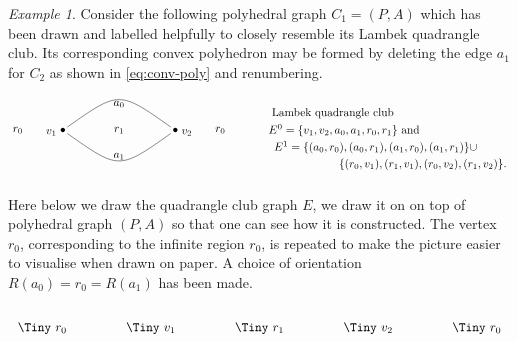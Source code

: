 \documentclass[12pt]{amsart}
\theoremstyle{definition}
\theoremstyle{remark}
\newtheorem{example}[thm]{Example}
\numberwithin{equation}{section}
\begin{document}
\begin{example} \label{ex:C1}
Consider the following polyhedral graph $C_1=(P,A)$ which has been drawn and labelled helpfully to closely resemble its Lambek quadrangle club. Its corresponding convex polyhedron may be formed by deleting the edge $a_1$ for $C_2$ as shown in \eqref{eq:conv-poly} and renumbering.
\[
\begin{tikzpicture}[scale=3.5]

\node[inner sep=1pt, circle] (00) at (0,0) {$\bullet$};
\node[inner sep=1pt, circle] (10) at (1,0) {$\bullet$};

\node at (0.5,0) {\tiny $r_1$};
\node at (-0.4,0) {\tiny $r_0$};
\node at (1.4,0) {\tiny $r_0$};

\draw (10) .. controls +(-0.5,+0.35) .. (00) node[pos=0.5,anchor=north,inner sep=1pt, black] {\tiny$a_0$};

\draw (00) .. controls +(0.5,-0.35) .. (10) node[pos=0.5,anchor=south,inner sep=1pt, black] {\tiny$a_1$};

\node[left] at (-0.02,-0.02) {\tiny\color{black} $v_1$};

\node[right] at (1.02,-0.02) {\tiny\color{black} $v_2$};

\node at (2.4,0.15) {Lambek quadrangle club};
\node at (2.5,0) {$E^0 = \{ v_1 , v_2 ,a_0 , a_1 , r_0 , r_1 \}$ and};
\node at (2.78,-0.15){$E^1 = \{ ( a_0 , r_0 ) , ( a_0 , r_1 ) , ( a_1 ,r_0 ) , ( a_1 , r_1) \}\cup$};
\node at (3.2,-0.3) {$\{ (  r_0 , v_1 ) , (  r_1 ,v_1 ) , (r_0 , v_2) , ( r_1 , v_2 ) \} .$};
\end{tikzpicture}
\]

\noindent
Here below we draw the quadrangle club graph $E$, we draw it on on top of polyhedral graph $(P,A)$ so that one can see how it is constructed. The vertex $r_0$, corresponding to the infinite region $r_0$, is repeated to make the picture easier to visualise when drawn on paper. A choice of orientation $R(a_0)=r_0=R(a_1)$ has been made.
\begin{equation} \label{eq:C2uncoloured}
\begin{array}{c}
\begin{tikzpicture}[->=stealth]

\node[inner sep=1pt,circle] (p0) at (-3,0) {\Tiny $v_1$};
\node[inner sep=1pt,circle] (p1) at (3,0) {\Tiny $v_2$};

\node[inner sep=1pt,circle] (f0) at (0,0) {\Tiny $r_1$};

\node[inner sep=1pt,circle] (lf1) at (-6,0) {\Tiny $r_0$};
\node[inner sep=1pt,circle] (rf1) at (6,0) {\Tiny $r_0$};


\end{tikzpicture}
\end{array}
\end{equation}
\end{example}
\end{document}
